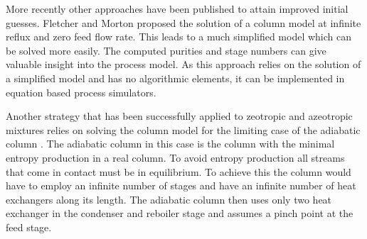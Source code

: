         More recently other approaches have been published to attain improved initial guesses.
        Fletcher and Morton \cite{Fletcher.2000} proposed the solution of a column model at
        infinite reflux and zero feed flow rate. This leads to a much simplified model which can
        be solved more easily. The computed purities and stage numbers can give valuable insight
        into the process model. As this approach relies on the solution of a simplified model
        and has no algorithmic elements, it can be implemented in equation based process simulators.

        Another strategy that has been successfully applied to zeotropic and azeotropic mixtures
        relies on solving the column model for the limiting case of the adiabatic column \cite{Barttfeld.2002}.
        The adiabatic column in this case is the column with the minimal entropy production in a real column.
        To avoid entropy production all streams that come in contact must be in equilibrium. To achieve this
        the column would have to employ an infinite number of stages and have an infinite number of
        heat exchangers along its length. The adiabatic column then uses only two heat exchanger in the
        condenser and reboiler stage and assumes a pinch point at the feed stage. 


